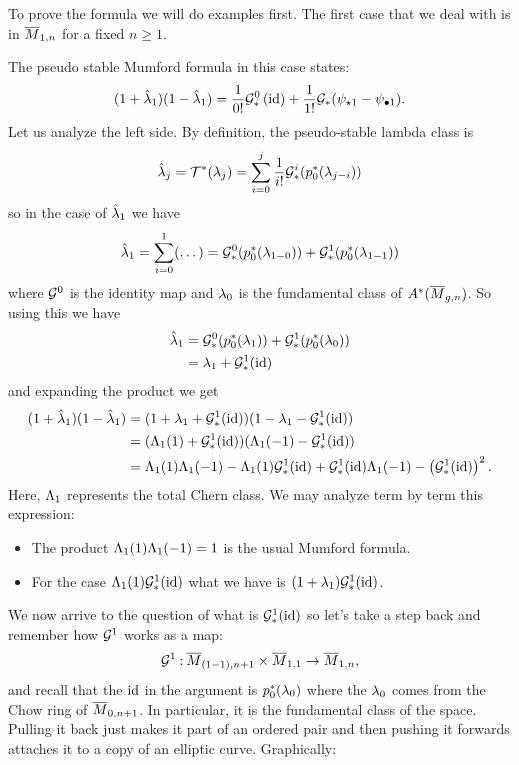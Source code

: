 \documentclass[12pt]{memoir}
\begin{document}
To prove the formula we will do examples first. The first case that we deal with is in $\overline M_{1,n}$ for a fixed $n\geq 1$.

\begin{Ex}
    The pseudo stable Mumford formula in this case states:
$$(1+\hat{\lambda}_1)(1-\hat{\lambda}_1)=\frac{1}{0!}\mathcal{G}_\ast^0\left(\operatorname{id}\right)+\frac{1}{1!}\mathcal{G}_\ast(\psi_{\star 1}-\psi_{\bullet 1}).$$
    Let us analyze the left side. By definition, the pseudo-stable lambda class is 
    $$\hat{\lambda}_j=\mathcal{T}^\ast(\lambda_j)=\sum_{i=0}^j\frac{1}{i!}\mathcal{G}_\ast^i(p_0^\ast(\lambda_{j-i}))$$
    so in the case of $\hat{\lambda}_1$ we have 
    $$\hat{\lambda}_1=\sum_{i=0}^1(\dots)=\mathcal{G}_\ast^0(p_0^\ast(\lambda_{1-0}))+\mathcal{G}_\ast^1(p_0^\ast(\lambda_{1-1}))$$
    where $\mathcal{G}^0$ is the identity map and $\lambda_0$ is the fundamental class of $A^\ast(\overline M_{g,n})$. So using this we have 
    \begin{align*}
        \hat{\lambda}_1&=\mathcal{G}_\ast^0(p_0^\ast(\lambda_{1}))+\mathcal{G}_\ast^1(p_0^\ast(\lambda_{0}))\\
        &=\lambda_1+\mathcal{G}_\ast^1(\operatorname{id})
    \end{align*}
    and expanding the product we get 
    \begin{align*}
        (1+\hat{\lambda}_1)(1-\hat{\lambda}_1)&=(1+\lambda_1+\mathcal{G}_\ast^1(\operatorname{id}))(1-\lambda_1-\mathcal{G}_\ast^1(\operatorname{id}))\\
        &=(\Lambda_1(1)+\mathcal{G}_\ast^1(\operatorname{id}))(\Lambda_1(-1)-\mathcal{G}_\ast^1(\operatorname{id}))\\
        &=\Lambda_1(1)\Lambda_1(-1)-\Lambda_1(1)\mathcal{G}_\ast^1(\operatorname{id})+\mathcal{G}_\ast^1(\operatorname{id})\Lambda_1(-1)-\left(\mathcal{G}_\ast^1(\operatorname{id})\right)^2.
    \end{align*}
    Here, $\Lambda_1$ represents the total Chern class. We may analyze term by term this expression:
    \begin{itemize}
        \item The product $\Lambda_1(1)\Lambda_1(-1)=1$ is the usual Mumford formula. 
        \item For the case $\Lambda_1(1)\mathcal{G}_\ast^1(\operatorname{id})$ what we have is $(1+\lambda_1)\mathcal{G}_\ast^1(\operatorname{id})$.
    \end{itemize}
    We now arrive to the question of what is $\mathcal{G}_\ast^1(\operatorname{id})$ so let's take a step back and remember how $\mathcal{G}^1$ works as a map:
    $$\mathcal{G}^1\mathbin{:} \overline M_{(1-1),n+1}\times\overline M_{1,1}\to \overline M_{1,n},$$
    and recall that the $\operatorname{id}$ in the argument is $p_0^\ast(\lambda_0)$ where the $\lambda_0$ comes from the Chow ring of $\overline M_{0,n+1}$. In particular, it is the fundamental class of the space. Pulling it back just makes it part of an ordered pair and then pushing it forwards attaches it to a copy of an elliptic curve. Graphically:

\end{Ex}
\end{document}
